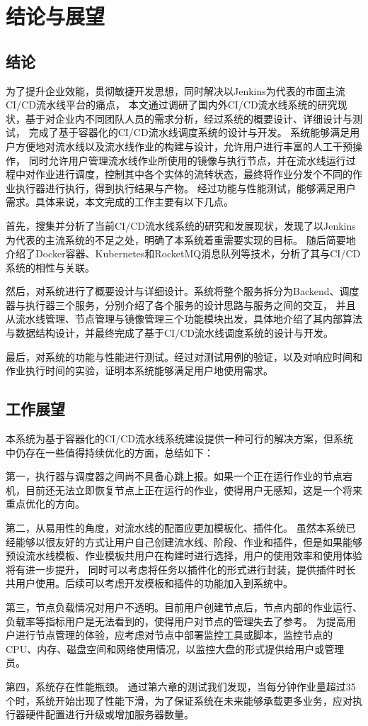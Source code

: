 
\chapter{结论与展望}

\section{结论}

为了提升企业效能，贯彻敏捷开发思想，同时解决以Jenkins为代表的市面主流CI/CD流水线平台的痛点，
本文通过调研了国内外CI/CD流水线系统的研究现状，基于对企业内不同团队人员的需求分析，经过系统的概要设计、详细设计与测试，
完成了基于容器化的CI/CD流水线调度系统的设计与开发。
系统能够满足用户方便地对流水线以及流水线作业的构建与设计，允许用户进行丰富的人工干预操作，
同时允许用户管理流水线作业所使用的镜像与执行节点，并在流水线运行过程中对作业进行调度，控制其中各个实体的流转状态，最终将作业分发个不同的作业执行器进行执行，得到执行结果与产物。
经过功能与性能测试，能够满足用户需求。具体来说，本文完成的工作主要有以下几点。

首先，搜集并分析了当前CI/CD流水线系统的研究和发展现状，发现了以Jenkins为代表的主流系统的不足之处，明确了本系统着重需要实现的目标。
随后简要地介绍了Docker容器、Kubernetes和RocketMQ消息队列等技术，分析了其与CI/CD系统的相性与关联。

然后，对系统进行了概要设计与详细设计。系统将整个服务拆分为Backend、调度器与执行器三个服务，分别介绍了各个服务的设计思路与服务之间的交互，
并且从流水线管理、节点管理与镜像管理三个功能模块出发，具体地介绍了其内部算法与数据结构设计，并最终完成了基于CI/CD流水线调度系统的设计与开发。

最后，对系统的功能与性能进行测试。经过对测试用例的验证，以及对响应时间和作业执行时间的实验，证明本系统能够满足用户地使用需求。

\section{工作展望}

本系统为基于容器化的CI/CD流水线系统建设提供一种可行的解决方案，但系统中仍存在一些值得持续优化的方面，总结如下：

第一，执行器与调度器之间尚不具备心跳上报。如果一个正在运行作业的节点宕机，目前还无法立即恢复节点上正在运行的作业，使得用户无感知，这是一个将来重点优化的方向。

第二，从易用性的角度，对流水线的配置应更加模板化、插件化。
虽然本系统已经能够以很友好的方式让用户自己创建流水线、阶段、作业和插件，但是如果能够预设流水线模板、作业模板共用户在构建时进行选择，用户的使用效率和使用体验将有进一步提升，
同时可以考虑将任务以插件化的形式进行封装，提供插件时长共用户使用。后续可以考虑开发模板和插件的功能加入到系统中。

第三，节点负载情况对用户不透明。目前用户创建节点后，节点内部的作业运行、负载率等指标用户是无法看到的，使得用户对节点的管理失去了参考。
为提高用户进行节点管理的体验，应考虑对节点中部署监控工具或脚本，监控节点的CPU、内存、磁盘空间和网络使用情况，以监控大盘的形式提供给用户或管理员。

第四，系统存在性能瓶颈。
通过第六章的测试我们发现，当每分钟作业量超过35个时，系统开始出现了性能下滑，为了保证系统在未来能够承载更多业务，应对执行器硬件配置进行升级或增加服务器数量。